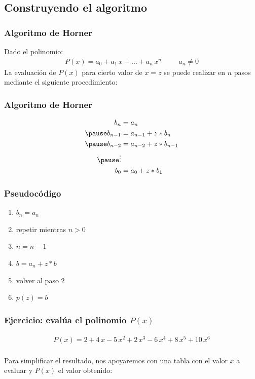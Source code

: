 \documentclass[12pt]{beamer}
\begin{document}
\subsection{Construyendo el algoritmo}

\begin{frame}
\frametitle{Algoritmo de Horner}
Dado el polinomio:
\begin{align*}
P (x) = a_{0} + a_{1} \, x + \ldots + a_{n} \, x^{n} \hspace{1cm} a_{n} \neq 0
\end{align*}
\pause
La evaluación de $P (x)$ para cierto valor de $x = z$ se puede realizar en $n$ pasos mediante el siguiente procedimiento:
\end{frame}
\begin{frame}
\frametitle{Algoritmo de Horner}
\begin{eqnarray*}
\begin{aligned}
b_{n} &= a_{n} \\ \pause
b_{n-1} &= a_{n-1} + z*b_{n} \\ \pause
b_{n-2} &= a_{n-2} + z*b_{n-1} \\ \pause
\vdots \\
b_{0} &= a_{0} + z*b_{1}
\end{aligned}
\end{eqnarray*}
\end{frame}
\begin{frame}
\frametitle{Pseudocódigo}
\begin{enumerate}[<+->]
\item $b_{n} = a_{n}$
\item repetir mientras $n > 0$
\item $n = n - 1$
\item $b = a_{n} + z*b$
\item volver al paso 2
\item $p (z) = b$
\end{enumerate}
\end{frame}
\begin{frame}
\frametitle{Ejercicio: evalúa el polinomio $P(x)$}
\begin{align*}
P (x) =2 + 4 \, x - 5 \, x^{2} + 2 \, x^{3} - 6 \, x^{4} + 8 \, x^{5} + 10 \, x^{6}
\end{align*}
\\
\bigskip
\pause
Para simplificar el resultado, nos apoyaremos con una tabla con el valor $x$ a evaluar y $P (x)$ el valor obtenido:
\end{frame}
\end{document}
